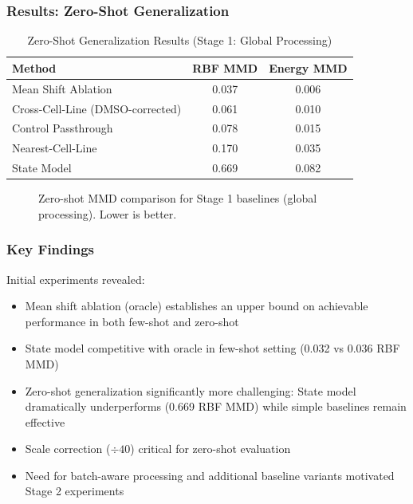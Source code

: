 \documentclass[conference]{IEEEtran}
\begin{document}
\subsubsection{Results: Zero-Shot Generalization}

\begin{table}[h]
\centering
\caption{Zero-Shot Generalization Results (Stage 1: Global Processing)}
\label{tab:zeroshot-stage1}
\begin{tabular}{lcc}
\toprule
\textbf{Method} & \textbf{RBF MMD} & \textbf{Energy MMD} \\
\midrule
Mean Shift Ablation & 0.037 & 0.006 \\
Cross-Cell-Line (DMSO-corrected) & 0.061 & 0.010 \\
Control Passthrough & 0.078 & 0.015 \\
Nearest-Cell-Line & 0.170 & 0.035 \\
State Model & 0.669 & 0.082 \\
\bottomrule
\end{tabular}
\end{table}

\begin{figure}[h]
\centering
\caption{Zero-shot MMD comparison for Stage 1 baselines (global processing). Lower is better.}
\label{fig:zeroshot-stage1}
\end{figure}

\subsubsection{Key Findings}

Initial experiments revealed:
\begin{itemize}
    \item Mean shift ablation (oracle) establishes an upper bound on achievable performance in both few-shot and zero-shot
    \item State model competitive with oracle in few-shot setting (0.032 vs 0.036 RBF MMD)
    \item Zero-shot generalization significantly more challenging: State model dramatically underperforms (0.669 RBF MMD) while simple baselines remain effective
    \item Scale correction ($\div 40$) critical for zero-shot evaluation
    \item Need for batch-aware processing and additional baseline variants motivated Stage 2 experiments
\end{itemize}
\end{document}
